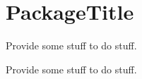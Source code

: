 \hypertarget{group___package_name}{\section{Package\+Title}
\label{group___package_name}
}


Provide some stuff to do stuff.  


Provide some stuff to do stuff. 

